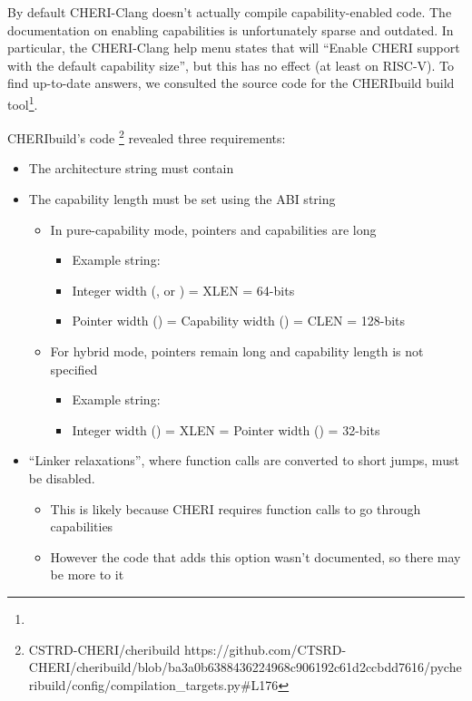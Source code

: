 By default CHERI-Clang doesn't actually compile capability-enabled code.
The documentation on enabling capabilities is unfortunately sparse and outdated.
In particular, the CHERI-Clang help menu states that  will \enquote{Enable CHERI support with the default capability size}, but this has no effect (at least on RISC-V).
To find up-to-date answers, we consulted the source code for the CHERIbuild build tool\footnote{}.

CHERIbuild's code%
\footnote{%
%
    {CSTRD-CHERI/cheribuild}%
    {https://github.com/CTSRD-CHERI/cheribuild/blob/ba3a0b6388436224968c906192c61d2ccbdd7616/pycheribuild/config/compilation_targets.py\#L176}%
} revealed three requirements:
\begin{itemize}
    \item The architecture string must contain 
    \item The capability length must be set using the ABI string
    \begin{itemize}
        \item In pure-capability mode, pointers and capabilities are  long
        \begin{itemize}
            \item Example string: 
            \item Integer width (, or ) = XLEN = 64-bits
            \item Pointer width () = Capability width () = CLEN = 128-bits
        \end{itemize}
        \item For hybrid mode, pointers remain  long and capability length is not specified
        \begin{itemize}
            \item Example string: 
            \item Integer width () = XLEN = Pointer width () = 32-bits
        \end{itemize}
    \end{itemize}
    \item ``Linker relaxations'', where function calls are converted to short jumps\cite{chenCompilerSupportLinker2019}, must be disabled.
    \begin{itemize}
        \item This is likely because CHERI requires function calls to go through capabilities
        \item However the code that adds this option wasn't documented, so there may be more to it
    \end{itemize}
\end{itemize}

